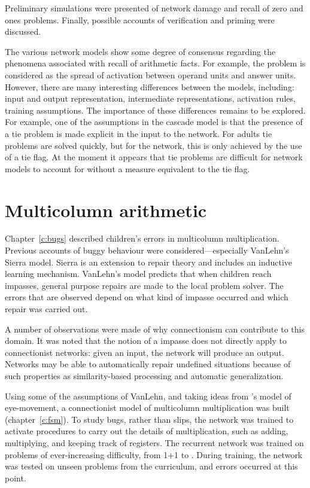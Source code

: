 Preliminary simulations were presented of network damage and
recall of zero and ones problems.  Finally, possible accounts of
verification and priming were discussed.

The various network
models show some degree of consensus regarding the phenomena
associated with recall of arithmetic facts.  For example, the problem is
considered as the spread of activation between operand units and answer
units.  However, there are many interesting differences between the models,
including: input and output representation, intermediate representations,
activation rules, training assumptions.  The importance of these
differences remains to be explored.  For example, one of the assumptions in
the cascade model is that the presence
of a tie problem is made explicit in the input to the
network.  For adults tie problems are solved quickly, but for the network,
this is only achieved by the use of a tie flag. At the moment it appears
that tie problems are difficult for network models to account for without a
measure equivalent to the tie flag.


\section{Multicolumn arithmetic}

Chapter~\ref{c:bugs} described children's errors in multicolumn
multiplication.  Previous accounts of buggy behaviour were
considered---especially VanLehn's Sierra model. Sierra is an extension to
repair theory and includes an inductive learning mechanism.  VanLehn's
model predicts that when children reach impasses, general purpose repairs
are made to the local problem solver. The errors that are observed depend
on what kind of impasse occurred and which repair was carried out.

A number of observations were made of why connectionism can contribute to
this domain.  It was noted that the notion of a impasse does not directly
apply to connectionist networks: given an input, the network will produce
an output.  Networks may be able to automatically repair undefined
situations because of such properties as similarity-based processing and
automatic generalization.

Using some of the assumptions of VanLehn, and taking ideas from
\citeauthor{suppproc}'s model of eye-movement, a connectionist model of
multicolumn multiplication was built (chapter~\ref{c:fsm}).  To study bugs,
rather than slips, the network was trained to activate procedures to carry
out the details of multiplication, such as adding, multiplying, and keeping
track of registers.  The recurrent network was trained on problems of
ever-increasing difficulty, from 1+1 to .    During training, the
network was tested on unseen problems from the curriculum, and errors
occurred at this point.

